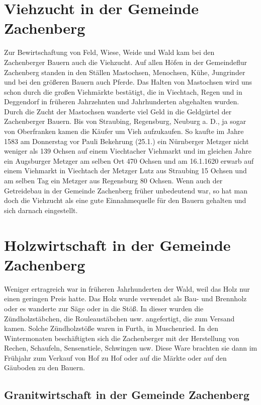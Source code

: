 \documentclass{book}
\begin{document}
\section{Viehzucht in der Gemeinde Zachenberg}

Zur Bewirtschaftung von Feld, Wiese, Weide und Wald kam bei den Zachenberger
Bauern auch die Viehzucht. Auf allen Höfen in der Gemeindeflur Zachenberg
standen in den Ställen Mastochsen, Menochsen, Kühe, Jungrinder und bei den
größeren Bauern auch Pferde. Das Halten von Mastochsen wird uns schon durch die
großen Viehmärkte bestätigt, die in Viechtach, Regen und in Deggendorf in
früheren Jahrzehnten und Jahrhunderten abgehalten wurden. Durch die Zucht der
Mastochsen wanderte viel Geld in die Geldgürtel der Zachenberger Bauern. Bis von
Straubing, Regensburg, Neuburg a. D., ja sogar von Oberfranken kamen die Käufer
um Vieh aufzukaufen. So kaufte im Jahre 1583 am Donnerstag vor Pauli Bekehrung
(25.1.) ein Nürnberger Metzger nicht weniger als 139 Ochsen auf einem
Viechtacher Viehmarkt und im gleichen Jahre ein Augsburger Metzger am selben Ort
470 Ochsen und am 16.1.1620 erwarb auf einem Viehmarkt in Viechtach der Metzger
Lutz aus Straubing 15 Ochsen und am selben Tag ein Metzger aus Regensburg 80
Ochsen. Wenn auch der Getreidebau in der Gemeinde Zachenberg früher unbedeutend
war, so hat man doch die Viehzucht als eine gute Einnahmequelle für den Bauern
gehalten und sich darnach eingestellt.

\section{Holzwirtschaft in der Gemeinde Zachenberg}

Weniger ertragreich war in früheren Jahrhunderten der Wald, weil das Holz nur
einen geringen Preis hatte. Das Holz wurde verwendet als Bau- und Brennholz oder
es wanderte zur Säge oder in die Stöß. In dieser wurden die Zündholzstäbchen,
die Rouleaustäbchen usw. angefertigt, die zum Versand kamen. Solche
Zündholzstöße waren in Furth, in Muschenried. In den Wintermonaten beschäftigten
sich die Zachenberger mit der Herstellung von Rechen, Schaufeln, Sensenstiele,
Schwingen usw. Diese Ware brachten sie dann im Frühjahr zum Verkauf von Hof zu
Hof oder auf die Märkte oder auf den Gäuboden zu den Bauern.

\subsection{Granitwirtschaft in der Gemeinde Zachenberg}
\end{document}
